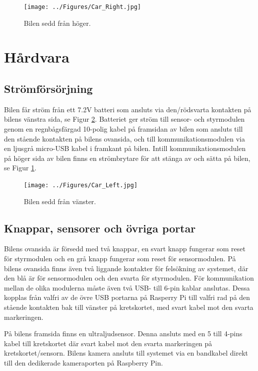 \documentclass[10pt,oneside,swedish]{lips}
\begin{document}
\begin{figure}[htbp]
  \centering
  \texttt{[image: ../Figures/Car\_Right.jpg]}
  \caption{Bilen sedd från höger.}
  \label{fig:car-right}
\end{figure}

\cleardoublepage
\section{Hårdvara}

\subsection{Strömförsörjning}
Bilen får ström från ett 7.2V batteri som ansluts via den/rödsvarta kontakten på bilens vänstra sida, se Figur \ref{fig:car-left}. Batteriet ger ström till sensor- och styrmodulen genom en regnbågsfärgad 10-polig kabel på framsidan av bilen som ansluts till den stående kontakten på bilens ovansida, och till kommunikationsmodulen via en ljusgrå micro-USB kabel i framkant på bilen. Intill kommunikationsmodulen på höger sida av bilen finns en strömbrytare för att stänga av och sätta på bilen, se Figur \ref{fig:car-right}.

\begin{figure}[htbp]
  \centering
  \texttt{[image: ../Figures/Car\_Left.jpg]}
  \caption{Bilen sedd från vänster.}
  \label{fig:car-left}
\end{figure}

\subsection{Knappar, sensorer och övriga portar}
Bilens ovansida är försedd med två knappar, en svart knapp fungerar som reset för styrmodulen och en grå knapp fungerar som reset för sensormodulen. På bilens ovansida finns även två liggande kontakter för felsökning av systemet, där den blå är för sensormodulen och den svarta för styrmodulen. För kommunikation mellan de olika modulerna måste även två USB- till 6-pin kablar anslutas. Dessa kopplas från valfri av de övre USB portarna på Rasperry Pi till valfri rad på den stående kontakten bak till vänster på kretskortet, med svart kabel mot den svarta markeringen.

\noindent
På bilens framsida finns en ultraljudsensor. Denna ansluts med en 5 till 4-pins kabel till kretskortet där svart kabel mot den svarta markeringen på kretskortet/sensorn. Bilens kamera ansluts till systemet via en bandkabel direkt till den dedikerade kameraporten på Raspberry Pin.
\end{document}
